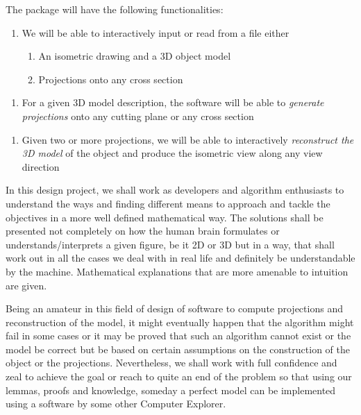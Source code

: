 \documentclass{article} %
\begin{document}
\noindent The package will have the following functionalities:

\begin{enumerate}
\item  We will be able to interactively input or read from a file either 

\begin{enumerate}
\item  An isometric drawing and a 3D object model 

\item  Projections onto any cross section
\end{enumerate}
\end{enumerate}

\noindent \textit{}

\begin{enumerate}
\item \textit{ }For a given 3D model description, the software will be able to \textit{generate projections }onto any cutting plane or any cross section
\end{enumerate}

\noindent 

\begin{enumerate}
\item  Given two or more projections, we will be able to interactively \textit{reconstruct the 3D model} of the object and produce the isometric view along any view direction
\end{enumerate}

\noindent 

\noindent In this design project, we shall work as developers and algorithm enthusiasts to understand the ways and finding different means to approach and tackle the objectives in a more well defined mathematical way. The solutions shall be presented not completely on how the human brain formulates or understands/interprets a given figure, be it 2D or 3D but in a way, that shall work out in all the cases we deal with in real life and definitely be understandable by the machine. Mathematical explanations that are more amenable to intuition are given.

\noindent 

\noindent Being an amateur in this field of design of software to compute projections and reconstruction of the model, it might eventually happen that the algorithm might fail in some cases or it may be proved that such an algorithm cannot exist or the model be correct but be based on certain assumptions on the construction of the object or the projections. Nevertheless, we shall work with full confidence and zeal to achieve the goal or reach to quite an end of the problem so that using our lemmas, proofs and knowledge, someday a perfect model can be implemented using a software by some other Computer Explorer. 
\end{document}
